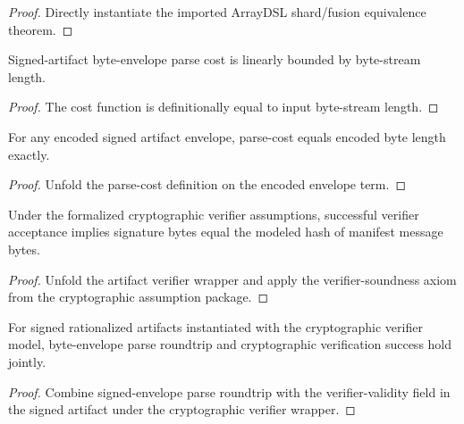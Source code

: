 \begin{proof}
Directly instantiate the imported ArrayDSL shard/fusion equivalence theorem.
\end{proof}

\begin{theorem}
\label{thm:definitive-parse-cost-linear-time}
Signed-artifact byte-envelope parse cost is linearly bounded by byte-stream length.
\end{theorem}

\begin{proof}
The cost function is definitionally equal to input byte-stream length.
\end{proof}

\begin{theorem}
\label{thm:definitive-parse-encode-cost-exact}
For any encoded signed artifact envelope, parse-cost equals encoded byte length exactly.
\end{theorem}

\begin{proof}
Unfold the parse-cost definition on the encoded envelope term.
\end{proof}

\begin{theorem}
\label{thm:definitive-crypto-verifier-sound}
Under the formalized cryptographic verifier assumptions, successful verifier acceptance implies signature bytes equal the modeled hash of manifest message bytes.
\end{theorem}

\begin{proof}
Unfold the artifact verifier wrapper and apply the verifier-soundness axiom from the cryptographic assumption package.
\end{proof}

\begin{theorem}
\label{thm:definitive-signed-rationalized-crypto-byte-parse-verify}
For signed rationalized artifacts instantiated with the cryptographic verifier model, byte-envelope parse roundtrip and cryptographic verification success hold jointly.
\end{theorem}

\begin{proof}
Combine signed-envelope parse roundtrip with the verifier-validity field in the signed artifact under the cryptographic verifier wrapper.
\end{proof}

